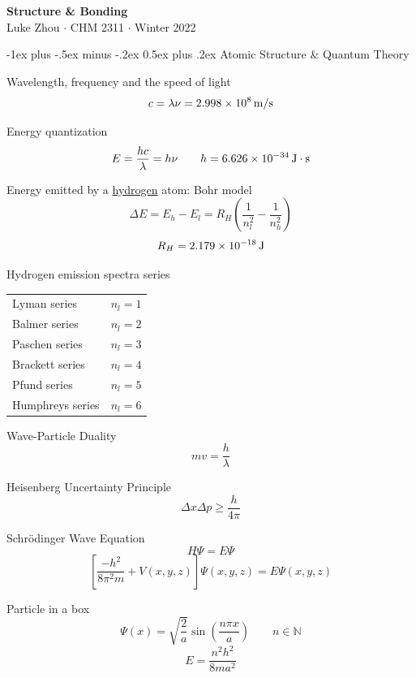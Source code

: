 \documentclass[10pt,landscape]{article}
\makeatletter
\renewcommand{\section}{\@startsection{section}{1}{0mm}%
                                {-1ex plus -.5ex minus -.2ex}%
                                {0.5ex plus .2ex}%
                                {\normalfont\large\bfseries}}
\newcommand{\extraline}{\vspace{1em}}
\newcommand{\tableindent}{\hspace{1.5em}}
\makeatother
\begin{document}
\raggedright
\footnotesize
\begin{multicols}{3}

\setlength{\premulticols}{1pt}
\setlength{\postmulticols}{1pt}
\setlength{\multicolsep}{1pt}
\setlength{\columnsep}{2pt}

\begin{center}
     \Large{\textbf{Structure \& Bonding}} \\
     \small{Luke Zhou $\cdot$ CHM 2311 $\cdot$ Winter 2022}
\end{center}

\section{Atomic Structure \& Quantum Theory}

Wavelength, frequency and the speed of light
\[ c = \lambda\nu  = \SI{2.998E8}{\meter/\second}  \]

Energy quantization
\[E = \frac{hc}{\lambda} = h\nu  \qquad
 h = \SI{6.626E-34}{\joule\cdot\second}  \]

Energy emitted by a \underline{hydrogen} atom: Bohr model
 \[ \Delta E = E_{h} - E_{l} = R_H \left(  \frac{1}{n_l^2} - \frac{1}{n_h^2} \right) \] 
 \[ R_H =  \SI{2.179E-18}{\joule} \]

Hydrogen emission spectra series \\
\begin{tabular}{@{\tableindent}ll@{}}
	Lyman series & $n_l = 1$ \\
	Balmer series & $n_l = 2$ \\
	Paschen series & $n_l = 3$ \\
	Brackett series & $n_l = 4$ \\
	Pfund series & $n_l = 5$ \\
	Humphreys series & $n_l = 6$ \\
\end{tabular}
\extraline

Wave-Particle Duality  
\[  mv = \frac{h}{\lambda} \]


Heisenberg Uncertainty Principle
\[  \Delta x \Delta p \geq \frac{h}{4\pi} \]

Schrödinger Wave Equation
\[ H\Psi = E\Psi  \]
\[ \left[ \frac{-h^2}{8\pi^2m} +
V(x,y,z)\right] \Psi(x,y,z) = E\Psi(x,y,z)  \]
	
Particle in a box
\[ \Psi(x) = \sqrt{\frac{2}{a}} \sin\left( \frac{n\pi x}{a} \right)  \qquad n \in \mathbb{N} \]
\[ E = \frac{n^2h^2}{8ma^2} \]


\end{multicols}
\end{document}

